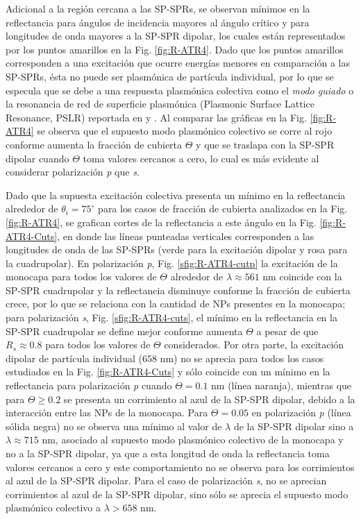 Adicional a la región cercana a las SP-SPRs, se observan mínimos en la reflectancia para ángulos de incidencia mayores al ángulo crítico y para longitudes de onda mayores a la SP-SPR dipolar, los cuales están  representados por los puntos amarillos en la Fig. \ref{fig:R-ATR4}. Dado que los puntos amarillos corresponden a una excitación que ocurre energías  menores en comparación a las SP-SPRs, ésta no puede ser plasmónica de partícula individual,  por lo que se especula que se debe a una respuesta plasmónica colectiva como el \emph{modo guiado} o la resonancia de red de superficie plasmónica (Plasmonic Surface Lattice Resonance, PSLR) reportada en \cite{kabashin2009plasmonic} y \cite{danilov2018ultra}. Al comparar las gráficas en la  Fig.  \ref{fig:R-ATR4} se observa que el supuesto modo plasmónico colectivo se corre al rojo  conforme aumenta la fracción de cubierta $\Theta$ y que se traslapa con la SP-SPR dipolar cuando $\Theta$ toma valores cercanos a cero, lo cual es más evidente al considerar polarización \emph{p} que \emph{s}.

Dado que la supuesta excitación colectiva presenta un mínimo en la reflectancia  alrededor de $\theta_i = 75^\circ$ para los casos de fracción de cubierta analizados en la Fig.  \ref{fig:R-ATR4}, se grafican cortes de la reflectancia a este ángulo en la Fig. \ref{fig:R-ATR4-Cuts}, en donde las líneas punteadas verticales corresponden a las longitudes de onda de las SP-SPRs (verde para la excitación dipolar y rosa para la cuadrupolar). En polarización \emph{p}, Fig. \ref{sfig:R-ATR4-cutp} la excitación de la monocapa para todos los valores de $\Theta$ alrededor de $\lambda \approx 561$ nm coincide con la SP-SPR cuadrupolar y la reflectancia disminuye conforme la fracción de cubierta crece, por lo que se relaciona con la cantidad de NPs presentes en la monocapa; para polarización \emph{s}, Fig. \ref{sfig:R-ATR4-cuts}, el mínimo en la reflectancia en la SP-SPR cuadrupolar se define mejor conforme aumenta $\Theta$ a pesar de que $R_s\approx 0.8$ para todos los valores de $\Theta$ considerados. Por otra parte, la excitación dipolar de partícula individual ($658$ nm) no se aprecia para todos los casos estudiados en la Fig. \ref{fig:R-ATR4-Cuts} y sólo coincide con un mínimo en la reflectancia para polarización \emph{p} cuando $\Theta=0.1$ nm (línea naranja), mientras que para $\Theta \geq 0.2$ se presenta un corrimiento al azul de la SP-SPR dipolar, debido a la interacción entre las NPs de la monocapa. Para $\Theta=0.05$ en polarización \emph{p} (línea sólida negra) no se observa una mínimo al valor de $\lambda$ de la SP-SPR dipolar sino a $\lambda\approx 715$ nm, asociado al supuesto modo plasmónico colectivo de la monocapa y no a la SP-SPR dipolar, ya que a esta longitud de onda la reflectancia toma valores cercanos a cero y este comportamiento no se observa para los corrimientos al azul de la SP-SPR dipolar. Para el caso de polarización \emph{s}, no se aprecian corrimientos al azul de la SP-SPR dipolar, sino sólo se aprecia el supuesto modo plasmónico colectivo a $\lambda>658$ nm.

